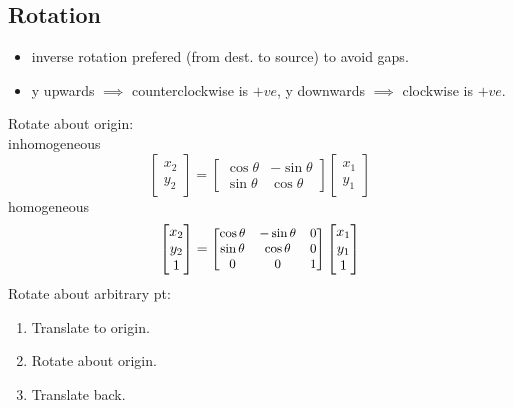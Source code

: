 \subsection{Rotation}
\begin{itemize}
  \item inverse rotation prefered (from dest. to source) to avoid gaps.
  \item y upwards $\implies$ counterclockwise is $+ve$,
  y downwards $\implies$ clockwise is $+ve$.
\end{itemize}
Rotate about origin:\\
inhomogeneous
\[\begin{bmatrix}
  x_2\\
  y_2
\end{bmatrix} =
\begin{bmatrix}
  \cos{\theta} & -\sin{\theta}\\
  \sin{\theta} & \cos{\theta}
\end{bmatrix}
\begin{bmatrix}
  x_1\\
  y_1
\end{bmatrix}\]
homogeneous
\[\begin{bmatrix}
  x_2\\
  y_2\\
  1
\end{bmatrix}=
{\small
\begin{bmatrix}
  \cos{\theta}  & -\sin{\theta}  & 0\\
  \sin{\theta}  & \cos{\theta}   & 0\\
  0 & 0 & 1
\end{bmatrix}}
\begin{bmatrix}
  x_1\\
  y_1\\
  1
\end{bmatrix}\]
Rotate about arbitrary pt:
\begin{enumerate}
  \item Translate to origin.
  \item Rotate about origin.
  \item Translate back.
\end{enumerate}
